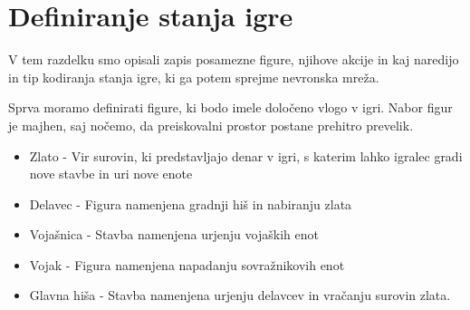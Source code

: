 \documentclass[a4paper, 12pt]{book}
\begin{document}
\section{Definiranje stanja igre}
V tem razdelku smo opisali zapis posamezne figure, njihove akcije in kaj naredijo in tip kodiranja stanja igre, ki ga potem sprejme nevronska mreža.

Sprva moramo definirati figure, ki bodo imele določeno vlogo v igri. Nabor figur je majhen, saj nočemo, da preiskovalni prostor postane prehitro prevelik.
\begin{itemize}
	\item Zlato - Vir surovin, ki predstavljajo denar v igri, s katerim lahko igralec gradi nove stavbe in uri nove enote
	\item Delavec - Figura namenjena gradnji hiš in nabiranju zlata
	\item Vojašnica - Stavba namenjena urjenju vojaških enot
	\item Vojak - Figura namenjena napadanju sovražnikovih enot
	\item Glavna hiša - Stavba namenjena urjenju delavcev in vračanju surovin zlata.
\end{itemize}
\end{document}
